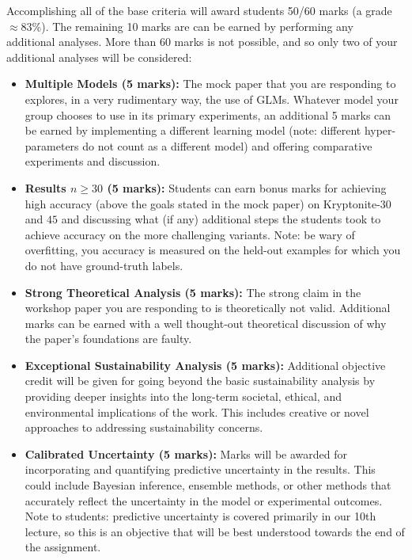 \documentclass{article}
\begin{document}
Accomplishing all of the base criteria will award students 50/60 marks (a grade $\approx 83$\%). The remaining 10 marks are can be earned by performing any additional analyses. More than 60 marks is not possible, and so only two of your additional analyses will be considered:
\begin{itemize}
    \item \textbf{Multiple Models (5 marks):}  The mock paper that you are responding to explores, in a very rudimentary way, the use of GLMs. Whatever model your group chooses to use in its primary experiments, an additional 5 marks can be earned by implementing a different learning model (note: different hyper-parameters do not count as a different model) and offering comparative experiments and discussion.

    \item \textbf{Results $n \geq 30$ (5 marks):} Students can earn bonus marks for achieving high accuracy (above the goals stated in the mock paper) on Kryptonite-$30$ and $45$ and discussing what (if any) additional steps the students took to achieve accuracy on the more challenging variants. Note: be wary of overfitting, you accuracy is measured on the held-out examples for which you do not have ground-truth labels. 

    \item \textbf{Strong Theoretical Analysis (5 marks):} The strong claim in the workshop paper you are responding to is theoretically not valid. Additional marks can be earned with a well thought-out theoretical discussion of why the paper's foundations are faulty.

    \item \textbf{Exceptional Sustainability Analysis (5 marks):} Additional objective credit will be given for going beyond the basic sustainability analysis by providing deeper insights into the long-term societal, ethical, and environmental implications of the work. This includes creative or novel approaches to addressing sustainability concerns.

    \item \textbf{Calibrated Uncertainty (5 marks):}  Marks will be awarded for incorporating and quantifying predictive uncertainty in the results. This could include Bayesian inference, ensemble methods, or other methods that accurately reflect the uncertainty in the model or experimental outcomes. Note to students: predictive uncertainty is covered primarily in our 10th lecture, so this is an objective that will be best understood towards the end of the assignment.
\end{itemize}
\end{document}

